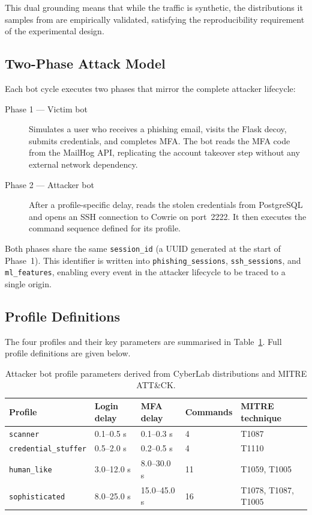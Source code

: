 This dual grounding means that while the traffic is synthetic, the distributions
it samples from are empirically validated, satisfying the reproducibility
requirement of the experimental design.

\subsection{Two-Phase Attack Model}

Each bot cycle executes two phases that mirror the complete attacker lifecycle:

\begin{description}
    \item[Phase 1 — Victim bot] Simulates a user who receives a phishing email,
    visits the Flask decoy, submits credentials, and completes MFA\@. The bot
    reads the MFA code from the MailHog API, replicating the account takeover
    step without any external network dependency.

    \item[Phase 2 — Attacker bot] After a profile-specific delay, reads the
    stolen credentials from PostgreSQL and opens an SSH connection to Cowrie on
    port~2222. It then executes the command sequence defined for its profile.
\end{description}

Both phases share the same \texttt{session\_id} (a UUID generated at the start
of Phase~1). This identifier is written into \texttt{phishing\_sessions},
\texttt{ssh\_sessions}, and \texttt{ml\_features}, enabling every event in the
attacker lifecycle to be traced to a single origin.

\subsection{Profile Definitions}

The four profiles and their key parameters are summarised in
Table~\ref{tab:bot_profiles}. Full profile definitions are given below.

\begin{table}[h]
\centering
\caption{Attacker bot profile parameters derived from CyberLab distributions and MITRE ATT\&CK.}
\label{tab:bot_profiles}
\begin{tabular}{lllll}
\hline
\textbf{Profile} & \textbf{Login delay} & \textbf{MFA delay} & \textbf{Commands} & \textbf{MITRE technique} \\
\hline
\texttt{scanner}            & 0.1–0.5 s  & 0.1–0.3 s  & 4  & T1087 \\
\texttt{credential\_stuffer} & 0.5–2.0 s  & 0.2–0.5 s  & 4  & T1110 \\
\texttt{human\_like}         & 3.0–12.0 s & 8.0–30.0 s & 11 & T1059, T1005 \\
\texttt{sophisticated}       & 8.0–25.0 s & 15.0–45.0 s & 16 & T1078, T1087, T1005 \\
\hline
\end{tabular}
\end{table}

